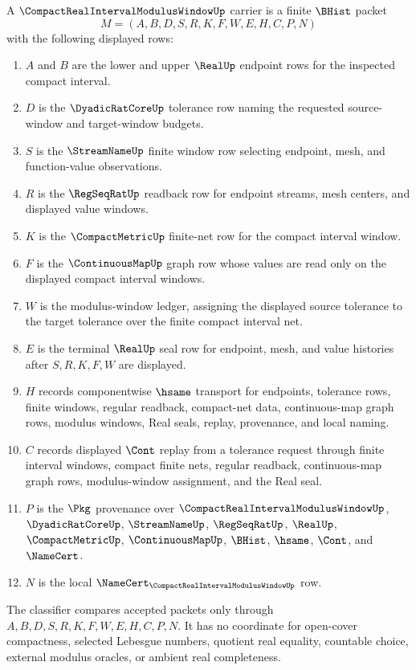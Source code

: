 \begin{definition}
\label{def:compact-real-interval-modulus-window-carrier}
A $\CompactRealIntervalModulusWindowUp$ carrier is a finite $\BHist$ packet
$$
M=(A,B,D,S,R,K,F,W,E,H,C,P,N)
$$
with the following displayed rows:
\begin{enumerate}
\item $A$ and $B$ are the lower and upper $\RealUp$ endpoint rows for the inspected compact interval.
\item $D$ is the $\DyadicRatCoreUp$ tolerance row naming the requested source-window and target-window budgets.
\item $S$ is the $\StreamNameUp$ finite window row selecting endpoint, mesh, and function-value observations.
\item $R$ is the $\RegSeqRatUp$ readback row for endpoint streams, mesh centers, and displayed value windows.
\item $K$ is the $\CompactMetricUp$ finite-net row for the compact interval window.
\item $F$ is the $\ContinuousMapUp$ graph row whose values are read only on the displayed compact interval windows.
\item $W$ is the modulus-window ledger, assigning the displayed source tolerance to the target tolerance over the finite compact interval net.
\item $E$ is the terminal $\RealUp$ seal row for endpoint, mesh, and value histories after $S,R,K,F,W$ are displayed.
\item $H$ records componentwise $\hsame$ transport for endpoints, tolerance rows, finite windows, regular readback, compact-net data, continuous-map graph rows, modulus windows, Real seals, replay, provenance, and local naming.
\item $C$ records displayed $\Cont$ replay from a tolerance request through finite interval windows, compact finite nets, regular readback, continuous-map graph rows, modulus-window assignment, and the Real seal.
\item $P$ is the $\Pkg$ provenance over $\CompactRealIntervalModulusWindowUp$, $\DyadicRatCoreUp$, $\StreamNameUp$, $\RegSeqRatUp$, $\RealUp$, $\CompactMetricUp$, $\ContinuousMapUp$, $\BHist$, $\hsame$, $\Cont$, and $\NameCert$.
\item $N$ is the local $\NameCert_{\CompactRealIntervalModulusWindowUp}$ row.
\end{enumerate}
The classifier compares accepted packets only through $A,B,D,S,R,K,F,W,E,H,C,P,N$. It has no coordinate for open-cover compactness, selected Lebesgue numbers, quotient real equality, countable choice, external modulus oracles, or ambient real completeness.
\end{definition}

